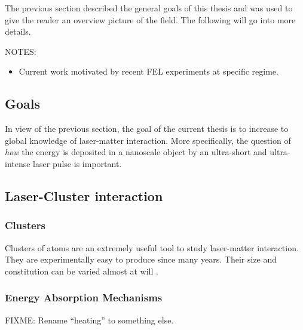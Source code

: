 
The previous section described the general goals of this thesis and was used to
give the reader an overview picture of the field. The following will go
into more details.

NOTES:
\begin{itemize}
\item Current work motivated by recent FEL experiments at specific regime.
\end{itemize}


\subsection{Goals}
In view of the previous section, the goal of the current thesis is to increase
to global knowledge of laser-matter interaction. More specifically, the
question of \textit{how} the energy is deposited in a nanoscale object by an
ultra-short and ultra-intense laser pulse is important.

\cite{Young2010,Chapman2011}

\subsection{Laser-Cluster interaction}
\cite{Reinhard2004}


\subsubsection{Clusters}
\label{section:intro:clusters:clusters}

Clusters of atoms are an extremely useful tool to study laser-matter
interaction. They are experimentally easy to produce since many
years\cite{Haberland1994}. Their size and constitution can be varied almost at
will \cite{Martin1996}.

\cite{Fennel2010}

\subsubsection{Energy Absorption Mechanisms}
\label{section:intro:clusters:heating}
FIXME: Rename ``heating'' to something else.

